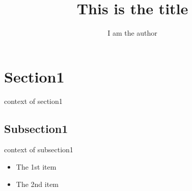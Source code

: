 \documentclass[11pt]{article}
\title{This is the title}
\author{I am the author}
\begin{document}
\maketitle
\section{Section1}
context of section1
\subsection{Subsection1}
context of subsection1
\begin{itemize}
  \item The 1st item
  \item The 2nd item
\end{itemize}
\end{document}
